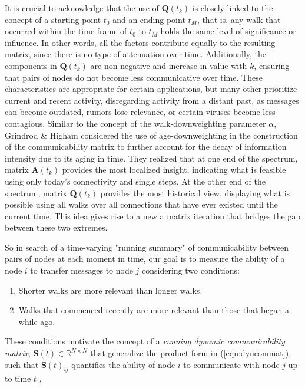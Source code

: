 It is crucial to acknowledge that the use of $\mathbf{Q}(t_k)$ is closely linked to the concept of a starting point $t_0$ and an ending point $t_M$, that is, any walk that occurred within the time frame of $t_0$ to $t_M$ holds the same level of significance or influence. In other words, all the factors contribute equally to the resulting matrix, since there is no type of attenuation over time. Additionally, the components in $\mathbf{Q}(t_k)$ are non-negative and increase in value with $k$, ensuring that pairs of nodes do not become less communicative over time. These characteristics are appropriate for certain applications, but many other prioritize current and recent activity, disregarding activity from a distant past, as messages can become outdated, rumors lose relevance, or certain viruses become less contagious. Similar to the concept of the walk-downweighting parameter $\alpha$, Grindrod \& Higham \cite{grindrod2013matrix} considered the use of age-downweighting in the construction of the communicability matrix to further account for the decay of information intensity due to its
aging in time. They realized that at one end of the spectrum, matrix $\mathbf{A}(t_k)$ provides the most localized insight, indicating what is feasible using only today's connectivity and single steps. At the other end of the spectrum, matrix $\mathbf{Q}(t_k)$ provides the most historical view, displaying what is possible using all walks over all connections that have ever existed until the current time. This idea gives rise to a new a matrix iteration that bridges the gap between these two extremes.

So in search of a time-varying "running summary" of communicability between pairs of nodes at each moment in time, our goal is to measure the ability of a node $i$ to transfer messages to node $j$ considering two conditions: 
\begin{enumerate}[label=(\roman*)]
  \item Shorter walks are more relevant than longer walks.
  \item Walks that commenced recently are more relevant than those that began a while ago.
\end{enumerate}

 These conditions motivate the concept of a \textit{running dynamic communicability matrix}, $\mathbf{S}(t)\in\mathbb{R}^{N\times N}$ that generalize the product form in (\ref{eqn:dyncommat}), such that $\mathbf{S}(t)_{ij}$ quantifies the ability of node $i$ to communicate with node $j$ up to time $t$ \cite{grindrod2013matrix},
 
